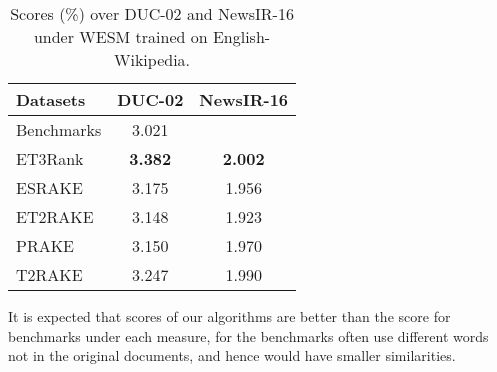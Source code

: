 \documentclass[a4paper,twoside]{article}
\begin{document}
\begin{table}[h]
\begin{center}
\caption{\label{results1} Scores (\%) over DUC-02  and NewsIR-16 under WESM trained on English-Wikipedia.}
\begin{tabular}{l|c|c}
\hline
\bf Datasets & \bf DUC-02 & \bf NewsIR-16 \\ %
\hline
Benchmarks & 3.021  & \\%
\hline









ET3Rank &\bf 3.382 &\bf 2.002 \\ %
ESRAKE      &3.175 & 1.956  \\ %
ET2RAKE     &3.148 &1.923   \\ %
PRAKE       &3.150 &1.970   \\ %
T2RAKE      &3.247 &1.990   \\ %
\hline
\end{tabular}
\end{center}
\end{table}
It is expected that scores of our algorithms are better than the score for benchmarks under each measure, for the benchmarks often use different words not in the original documents, and hence would
have smaller similarities.
\end{document}
